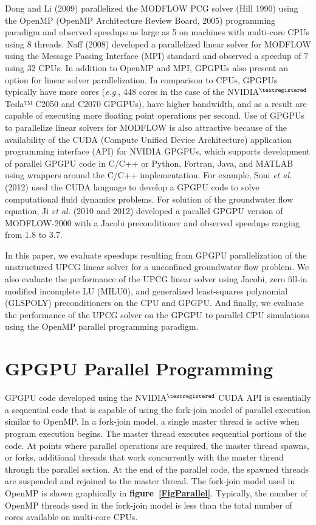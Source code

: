 \documentclass[12pt]{article}
\begin{document}
\color{black}Dong and Li (2009) parallelized the MODFLOW PCG solver (Hill 1990) using the OpenMP (OpenMP Architecture Review Board, 2005) programming paradigm and observed speedups as large as 5 on machines with multi-core CPUs \color{cyan}using 8 threads\color{black}. Naff (2008) developed a parallelized linear solver for MODFLOW using the Message Passing Interface (MPI) standard and observed a speedup of 7 \color{cyan}using 32 CPUs\color{black}. In addition to OpenMP and MPI, GPGPUs also \color{blue}present \color{black}an option for linear solver parallelization. In comparison to CPUs, GPGPUs \color{blue}typically have more cores (\textit{e.g.}, 448 cores in the case of the NVIDIA$^{\textregistered}$ Tesla™ C2050 and C2070 GPGPUs), have higher bandwidth, and as a result are capable of executing more floating point operations per second. \color{black}Use of GPGPUs to parallelize linear solvers for MODFLOW is also attractive because of the availability of the CUDA (Compute Unified Device Architecture) application programming interface (API) for NVIDIA GPGPUs, which supports development of parallel GPGPU code in C/C++ or Python, Fortran, Java, and MATLAB using wrappers around the C/C++ implementation. For example, Soni \textit{et al.} (2012) used the CUDA language to develop a GPGPU code to solve computational fluid dynamics problems. For solution of the groundwater flow equation, Ji \textit{et al.} (\color{cyan}2010 and \color{black}2012) developed a parallel GPGPU version of MODFLOW-2000 with a Jacobi preconditioner and observed speedups ranging from 1.8 to 3.7.

In this paper, we evaluate speedups resulting from GPGPU parallelization of the unstructured UPCG linear solver for a unconfined groundwater flow problem. We also evaluate the performance of the UPCG linear solver using Jacobi, zero fill-in modified incomplete LU (MILU0), and generalized least-squares polynomial (GLSPOLY) preconditioners on the CPU and GPGPU. And finally, we evaluate the performance of the UPCG solver on the GPGPU to parallel CPU simulations using the OpenMP parallel programming paradigm.

\section* {\bf GPGPU Parallel Programming}
GPGPU code developed using the NVIDIA$^{\textregistered}$ CUDA API is essentially a sequential code that is capable of using the fork-join model of parallel execution similar to OpenMP. In a fork-join model, a single master thread is active when program execution begins. The master thread executes sequential portions of the code. At points where parallel operations are required, the master thread spawns, or forks, additional threads that work concurrently with the master thread through the parallel section. At the end of the parallel code, the spawned threads are suspended and rejoined to the master thread. The fork-join model used in OpenMP is shown graphically in \textbf{figure~\ref{FigParallel}}. Typically, the number of OpenMP threads used in the fork-join model is less than the total number of cores available on multi-core CPUs.
\end{document}

